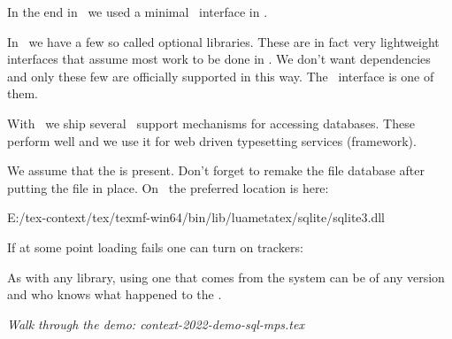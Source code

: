     \startitem
        In the end in \CONTEXT\ we used a minimal \FFI\ interface in \LUATEX.
    \stopitem

    \startitem
        In \LUAMETATEX\ we have a few so called optional libraries. These are
        in fact very lightweight interfaces that assume most work to be done in
        \LUA. We don't want dependencies and only these few are officially
        supported in this way. The \SQLITE\ interface is one of them.
    \stopitem

    \startitem
        With \CONTEXT\ we ship several \LUA\ support mechanisms for accessing
        databases. These perform well and we use it for web driven typesetting
        services (framework).
    \stopitem

\stopitemize

\stoptitle

\starttitle[title=Prerequisites]

We assume that the  is present. Don't forget to remake the
file database after putting the file in place. On \MSWINDOWS\ the preferred
location is here:

\starttyping
E:/tex-context/tex/texmf-win64/bin/lib/luametatex/sqlite/sqlite3.dll
\stoptyping

If at some point loading fails one can turn on trackers:

\starttyping
\enabletrackers[sql*]
\enabletrackers[*lib*]
\stoptyping

As with any library, using one that comes from the system can be of any version
and who knows what happened to the \API.

\blank[3*big]

{\em Walk through the demo: context-2022-demo-sql-mps.tex}

\stoptitle

\stopdocument
